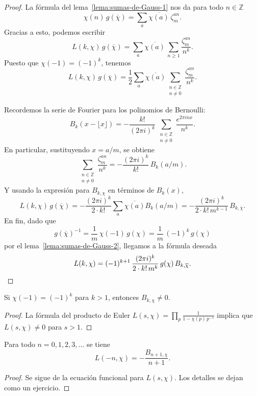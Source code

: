 \begin{proof}
  La fórmula del lema~\ref{lema:sumas-de-Gauss-1} nos da para todo
  $n \in \mathbb{Z}$
  \[ \chi (n)\,g (\overline{\chi}) =
     \sum_a \overline{\chi (a)}\,\zeta^{an}_m. \]
  Gracias a esto, podemos escribir
  \[ L (k,\chi)\,g (\overline{\chi}) =
     \sum_a \overline{\chi (a)} \, \sum_{n\ge 1} \frac{\zeta_m^{an}}{n^k}. \]
  Puesto que $\chi (-1) = (-1)^k$, tenemos
  \[ L (k,\chi)\,g (\overline{\chi}) =
     \frac{1}{2} \sum_a \overline{\chi (a)} \sum_{\substack{n \in \mathbb{Z} \\ n \ne 0}} \frac{\zeta_m^{an}}{n^k}. \]

  Recordemos la serie de Fourier para los polinomios de Bernoulli:
  \[ B_k (x - \lfloor x\rfloor) =
     -\frac{k!}{(2\pi i)^k} \, \sum_{\substack{n \in \mathbb{Z} \\ n \ne 0}} \frac{e^{2\pi i n x}}{n^k}. \]
  En particular, sustituyendo $x = a/m$, se obtiene
  \[ \sum_{\substack{n \in \mathbb{Z} \\ n \ne 0}} \frac{\zeta_m^{an}}{n^k} =
     -\frac{(2\pi i)^k}{k!}\,B_k (a/m). \]
  Y usando la expresión para $B_{k,\chi}$ en términos de $B_k (x)$,
  \[ L (k,\chi)\,g (\overline{\chi}) =
     -\frac{(2\pi i)^k}{2\cdot k!} \sum_a \overline{\chi (a)} B_k (a/m) =
     -\frac{(2\pi i)^k}{2\cdot k!\,m^{k-1}}\,B_{k,\overline{\chi}}. \]
  En fin, dado que
  \[ g (\overline{\chi})^{-1} =
     \frac{1}{m}\,\chi (-1)\,g (\chi) =
     \frac{1}{m}\,(-1)^k\,g (\chi) \]
  por el lema~\ref{lema:sumas-de-Gauss-2}, llegamos a la fórmula deseada
  \[ L (k,\chi) = (-1)^{k+1}\,\frac{(2\pi i)^k}{2\cdot k!\,m^k}\,g (\chi)\,B_{k,\overline{\chi}}. \qedhere \]
\end{proof}

\begin{corolario}
  Si $\chi (-1) = (-1)^k$ para $k > 1$, entonces $B_{k,\chi} \ne 0$.

  \begin{proof}
    La fórmula del producto de Euler
    $L (s,\chi) = \prod_p \frac{1}{1 - \chi (p)\,p^{-s}}$
    implica que $L (s,\chi) \ne 0$ para ${s > 1}$.
  \end{proof}
\end{corolario}

\begin{corolario}
  Para todo $n = 0,1,2,3,\ldots$ se tiene
  $$L (-n,\chi) = -\frac{B_{n+1,\chi}}{n+1}.$$

  \begin{proof}
    Se sigue de la ecuación funcional para $L (s,\chi)$. Los detalles se dejan
    como un ejercicio.
  \end{proof}
\end{corolario}

